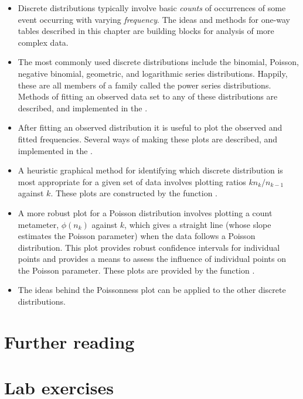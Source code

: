 \documentclass[11pt]{book}\usepackage[]{graphicx}\usepackage[]{color}
\begin{document}
\begin{itemize}
\item Discrete distributions typically involve basic \emph{counts} of occurrences
of some event occurring with varying \emph{frequency}. The ideas and methods
for one-way tables described in this chapter are building blocks for analysis
of more complex data.

\item The most commonly used discrete distributions include the binomial,
Poisson, negative binomial, geometric, and logarithmic series distributions.
Happily, these are all members of a family called the
power series distributions.
Methods of fitting an observed data set to any of these distributions are
described, and implemented in the .

\item After fitting an observed distribution it is useful to plot the observed
and fitted frequencies.
Several ways of making these plots are described, and implemented in the
.

\item A heuristic graphical method for identifying which discrete distribution is most
appropriate for a given set of data involves plotting ratios
$k n_k / n_{k-1}$ against $k$.
These plots are constructed by the function .

\item A more robust plot for a Poisson distribution involves plotting
a count metameter, $\phi ( n_k ) $ against $k$, which
gives a straight line (whose slope estimates the Poisson parameter)
when the data follows a Poisson distribution.
This plot provides robust confidence intervals for individual points
and provides a means to assess the influence of individual points
on the Poisson parameter.
These plots are provided by the function .
\item The ideas behind the Poissonness plot can be applied to the other
discrete distributions.
\end{itemize}


\section{Further reading}\label{sec:ch03-reading}

\section{Lab exercises}\label{sec:ch03-labs}
\end{document}
